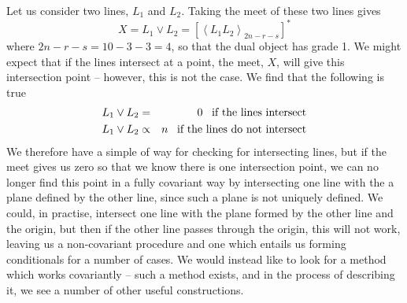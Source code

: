 Let us consider two lines, $L_1$ and $L_2$. Taking the
meet of these two lines gives
%
\begin{equation}
X = L_1 \vee L_2 = \left[\left< L_1 L_2
\right>_{2n-r-s}\right]^*
\end{equation}
%
where $2n-r-s=10-3-3=4$, so that the dual object has
grade 1. We might expect that if the lines intersect at a
point, the meet, $X$, will give this intersection point
-- however, this is not the case. We find that the
following is true
%
\begin{eqnarray}
L_1 \vee L_2 & = & 0 \;\;\; \mbox{if the lines intersect}
\nonumber \\
L_1 \vee L_2 & \propto & n \;\;\; \mbox{if the lines do
not intersect}
\end{eqnarray}
%
We therefore have a simple of way for checking for
intersecting lines, but if the meet gives us zero so that
we know there is one intersection point, we can no longer
find this point in a fully covariant way by intersecting
one line with the a plane defined by the other line,
since such a plane is not uniquely defined. We could, in
practise, intersect one line with the plane formed by the
other line and the origin, but then if the other line
passes through the origin, this will not work, leaving us
a non-covariant procedure and one which entails
us forming conditionals for a number of cases. We would
instead like to look for a method which works covariantly
-- such a method exists, and in the process of describing
it, we see a number of other useful constructions.

